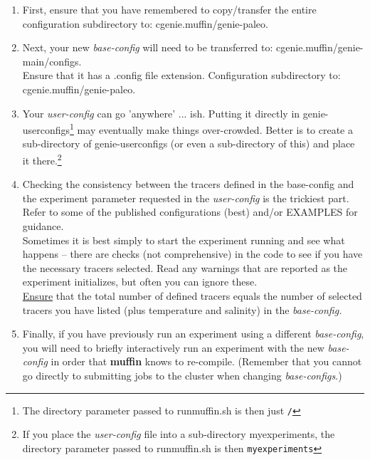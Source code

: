 \documentclass[11pt,fleqn]{book} %
\begin{document}
\begin{enumerate}[noitemsep]
\vspace{1mm}
\item First, ensure that you have remembered to copy/transfer the entire configuration subdirectory to: \textsf{\footnotesize cgenie.muffin/genie-paleo}.
\vspace{1mm}
\item Next, your new \textit{base-config} will need to be transferred to: \textsf{\footnotesize cgenie.muffin/genie-main/configs}.
\\Ensure that it has a \textsf{\footnotesize .config} file extension. Configuration subdirectory to: \textsf{\footnotesize cgenie.muffin/genie-paleo}.
\vspace{1mm}
\item Your \textit{user-config} can go 'anywhere' ... ish. Putting it directly in \textsf{\footnotesize genie-userconfigs}\footnote{The directory parameter passed to \textsf{\footnotesize runmuffin.sh} is then just \texttt{/}} may eventually make things over-crowded. Better is to create a sub-directory of \textsf{\footnotesize genie-userconfigs} (or even a sub-directory of this) and place it there.\footnote{If you place the \textit{user-config} file into a sub-directory  \textsf{\footnotesize myexperiments}, the directory parameter passed to \textsf{\footnotesize runmuffin.sh} is then \texttt{myexperiments}}
\vspace{1mm}
\item Checking the consistency between the tracers defined in the base-config and the experiment parameter requested in the \textit{user-config} is the trickiest part. Refer to some of the published configurations (best) and/or EXAMPLES for guidance.
\\ Sometimes it is best simply to start the experiment running and see what happens -- there are checks (not comprehensive) in the code to see if you have the necessary tracers selected. Read any warnings that are reported as the experiment initializes, but often you can ignore these.
\\\uline{Ensure} that the total number of defined tracers equals the number of selected tracers you have listed (plus temperature and salinity) in the \textit{base-config.}
\vspace{1mm}
\item Finally, if you have previously run an experiment using a different \textit{base-config}, you will need to briefly interactively run an experiment with the new \textit{base-config} in order that \textbf{muffin} knows to re-compile. (Remember that you cannot go directly to submitting jobs to the cluster when changing \textit{base-configs}.)
\end{enumerate}
\end{document}
